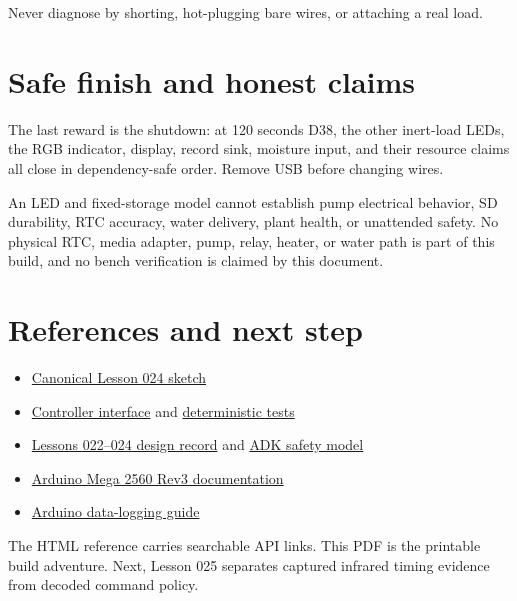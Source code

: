 \documentclass[11pt]{article}
\begin{document}
Never diagnose by shorting, hot-plugging bare wires, or attaching a real load.

\section{Safe finish and honest claims}

The last reward is the shutdown: at 120 seconds D38, the other inert-load LEDs,
the RGB indicator, display, record sink, moisture input, and their resource
claims all close in dependency-safe order. Remove USB before changing wires.

An LED and fixed-storage model cannot establish pump electrical behavior, SD
durability, RTC accuracy, water delivery, plant health, or unattended safety.
No physical RTC, media adapter, pump, relay, heater, or water path is part of
this build, and no bench verification is claimed by this document.

\section{References and next step}

\begin{itemize}
  \item \href{https://github.com/spincyc/adk/tree/main/examples/Lesson024GreenhouseTrainer}
  {Canonical Lesson 024 sketch}
  \item \href{https://github.com/spincyc/adk/blob/main/src/greenhouse_controller.h}
  {Controller interface} and
  \href{https://github.com/spincyc/adk/blob/main/tests/test_greenhouse_controller.cpp}
  {deterministic tests}
  \item \href{https://github.com/spincyc/adk/blob/main/docs/design/LESSONS_022_024.md}
  {Lessons 022--024 design record} and
  \href{https://github.com/spincyc/adk/blob/main/docs/SAFETY_MODEL.md}
  {ADK safety model}
  \item \href{https://docs.arduino.cc/hardware/mega-2560}
  {Arduino Mega 2560 Rev3 documentation}
  \item \href{https://docs.arduino.cc/learn/programming/sd-guide/}
  {Arduino data-logging guide}
\end{itemize}

The HTML reference carries searchable API links. This PDF is the printable
build adventure. Next, Lesson 025 separates captured infrared timing evidence
from decoded command policy.
\end{document}
